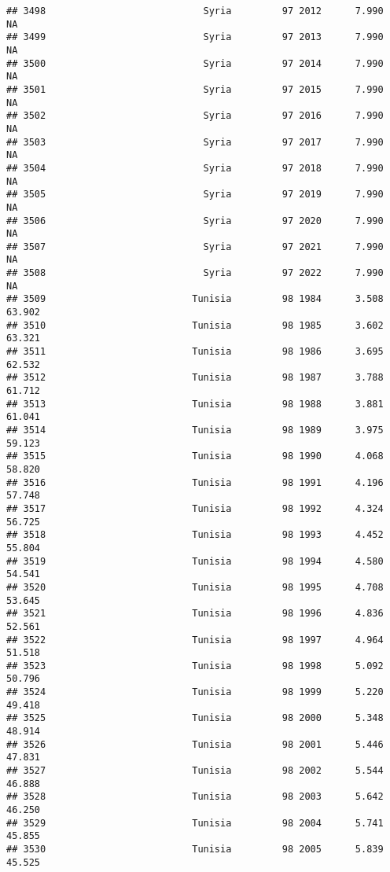 \documentclass[
]{article}
\begin{document}
\begin{verbatim}
## 3498                            Syria         97 2012      7.990         NA
## 3499                            Syria         97 2013      7.990         NA
## 3500                            Syria         97 2014      7.990         NA
## 3501                            Syria         97 2015      7.990         NA
## 3502                            Syria         97 2016      7.990         NA
## 3503                            Syria         97 2017      7.990         NA
## 3504                            Syria         97 2018      7.990         NA
## 3505                            Syria         97 2019      7.990         NA
## 3506                            Syria         97 2020      7.990         NA
## 3507                            Syria         97 2021      7.990         NA
## 3508                            Syria         97 2022      7.990         NA
## 3509                          Tunisia         98 1984      3.508     63.902
## 3510                          Tunisia         98 1985      3.602     63.321
## 3511                          Tunisia         98 1986      3.695     62.532
## 3512                          Tunisia         98 1987      3.788     61.712
## 3513                          Tunisia         98 1988      3.881     61.041
## 3514                          Tunisia         98 1989      3.975     59.123
## 3515                          Tunisia         98 1990      4.068     58.820
## 3516                          Tunisia         98 1991      4.196     57.748
## 3517                          Tunisia         98 1992      4.324     56.725
## 3518                          Tunisia         98 1993      4.452     55.804
## 3519                          Tunisia         98 1994      4.580     54.541
## 3520                          Tunisia         98 1995      4.708     53.645
## 3521                          Tunisia         98 1996      4.836     52.561
## 3522                          Tunisia         98 1997      4.964     51.518
## 3523                          Tunisia         98 1998      5.092     50.796
## 3524                          Tunisia         98 1999      5.220     49.418
## 3525                          Tunisia         98 2000      5.348     48.914
## 3526                          Tunisia         98 2001      5.446     47.831
## 3527                          Tunisia         98 2002      5.544     46.888
## 3528                          Tunisia         98 2003      5.642     46.250
## 3529                          Tunisia         98 2004      5.741     45.855
## 3530                          Tunisia         98 2005      5.839     45.525

\end{verbatim}
\end{document}
